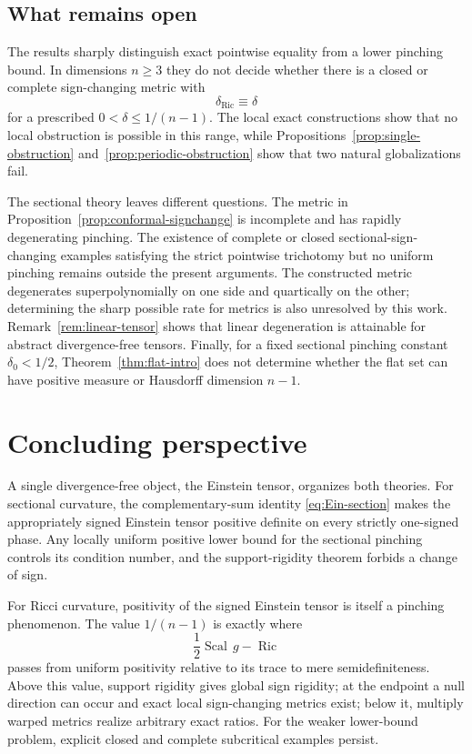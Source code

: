\documentclass[11pt,reqno]{amsart}
\theoremstyle{definition}
\theoremstyle{remark}
\newcommand{\Ric}{\operatorname{Ric}}
\newcommand{\Scal}{\operatorname{Scal}}
\newcommand{\dric}{\delta_{\mathrm{Ric}}}
\begin{document}
\subsection{What remains open}

The results sharply distinguish exact pointwise equality from a lower pinching bound.  In dimensions $n\ge3$ they do not decide whether there is a closed or complete sign-changing metric with
\[
\dric\equiv\delta
\]
for a prescribed $0<\delta\le1/(n-1)$.  The local exact constructions show that no local obstruction is possible in this range, while Propositions~\ref{prop:single-obstruction} and~\ref{prop:periodic-obstruction} show that two natural globalizations fail.

The sectional theory leaves different questions.  The metric in Proposition~\ref{prop:conformal-signchange} is incomplete and has rapidly degenerating pinching.  The existence of complete or closed sectional-sign-changing examples satisfying the strict pointwise trichotomy but no uniform pinching remains outside the present arguments.  The constructed metric degenerates superpolynomially on one side and quartically on the other; determining the sharp possible rate for metrics is also unresolved by this work.  Remark~\ref{rem:linear-tensor} shows that linear degeneration is attainable for abstract divergence-free tensors.  Finally, for a fixed sectional pinching constant $\delta_0<1/2$, Theorem~\ref{thm:flat-intro} does not determine whether the flat set can have positive measure or Hausdorff dimension $n-1$.

\section{Concluding perspective}

A single divergence-free object, the Einstein tensor, organizes both theories.  For sectional curvature, the complementary-sum identity \eqref{eq:Ein-section} makes the appropriately signed Einstein tensor positive definite on every strictly one-signed phase.  Any locally uniform positive lower bound for the sectional pinching controls its condition number, and the support-rigidity theorem forbids a change of sign.

For Ricci curvature, positivity of the signed Einstein tensor is itself a pinching phenomenon.  The value $1/(n-1)$ is exactly where
\[
\frac12\Scal\,g-\Ric
\]
passes from uniform positivity relative to its trace to mere semidefiniteness.  Above this value, support rigidity gives global sign rigidity; at the endpoint a null direction can occur and exact local sign-changing metrics exist; below it, multiply warped metrics realize arbitrary exact ratios.  For the weaker lower-bound problem, explicit closed and complete subcritical examples persist.
\end{document}
